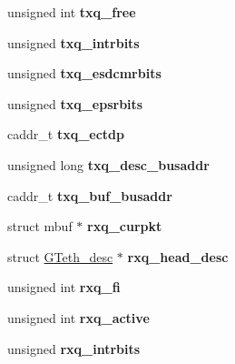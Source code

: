 \begin{DoxyCompactItemize}
unsigned int {\bfseries txq\+\_\+free}
\item 
\mbox{\label{structGTeth__softc_af2895b49cab4577fbd87b8d4e33a52c3}} 
unsigned {\bfseries txq\+\_\+intrbits}
\item 
\mbox{\label{structGTeth__softc_aac9ec4b0c2cbf414be419e4f953d8663}} 
unsigned {\bfseries txq\+\_\+esdcmrbits}
\item 
\mbox{\label{structGTeth__softc_a8c184babfe399f654b387bfdc6d387cc}} 
unsigned {\bfseries txq\+\_\+epsrbits}
\item 
\mbox{\label{structGTeth__softc_af8ffd1e3a1ce6b421f872ed57bea5495}} 
caddr\+\_\+t {\bfseries txq\+\_\+ectdp}
\item 
\mbox{\label{structGTeth__softc_a8a329990492f6cf4132a89449d01fac2}} 
unsigned long {\bfseries txq\+\_\+desc\+\_\+busaddr}
\item 
\mbox{\label{structGTeth__softc_a216533a6c1cb13f55e31628d1b2c7ef1}} 
caddr\+\_\+t {\bfseries txq\+\_\+buf\+\_\+busaddr}
\item 
\mbox{\label{structGTeth__softc_af6522448d3b2189daa59b122823b151b}} 
struct mbuf $\ast$ {\bfseries rxq\+\_\+curpkt}
\item 
\mbox{\label{structGTeth__softc_ad6abfbe1503b99aff36c349fe690fdc8}} 
struct \mbox{\hyperlink{structGTeth__desc}{G\+Teth\+\_\+desc}} $\ast$ {\bfseries rxq\+\_\+head\+\_\+desc}
\item 
\mbox{\label{structGTeth__softc_ac3bcff47cb56f281181fe4d558e57cfc}} 
unsigned int {\bfseries rxq\+\_\+fi}
\item 
\mbox{\label{structGTeth__softc_aef8125e3871097304fb7da150efbf4b7}} 
unsigned int {\bfseries rxq\+\_\+active}
\item 
\mbox{\label{structGTeth__softc_a1991898d0fa703c0fe13afecbd19e013}} 
unsigned {\bfseries rxq\+\_\+intrbits}
\item 

\end{DoxyCompactItemize}
